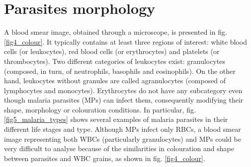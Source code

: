 \documentclass[final,a4paper,12pt,english]{UnicaPhdThesis3}
\begin{document}
	\section{Parasites morphology}
	A blood smear image, obtained through a microscope, is presented in fig. \ref{fig4_colour}. It typically contains at least three regions of interest: white blood cells (or leukocytes), red blood cells (or erythrocytes) and platelets (or thrombocytes). Two different categories of leukocytes exist: granulocytes (composed, in turn, of neutrophils, basophils and eosinophils). On the other hand, leukocytes without granules are called agranulocytes (composed of lymphocytes and monocytes). Erythrocytes do not have any subcategory even though malaria parasites (MPs) can infect them, consequently modifying their shape, morphology or colouration conditions. In particular, fig. \ref{fig5_malaria_types} shows several examples of malaria parasites in their different life stages and type.
	Although MPs infect only RBCs, a blood smear image representing both WBCs (particularly granulocytes) and MPs could be very difficult to analyse because of the similarities in colouration and shape between parasites and WBC grains, as shown in fig. \ref{fig4_colour}.
	
\end{document}
